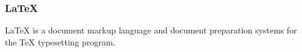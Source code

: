 \subsubsection*{LaTeX}

LaTeX is a document markup language and document preparation systems for the TeX typesetting program.
